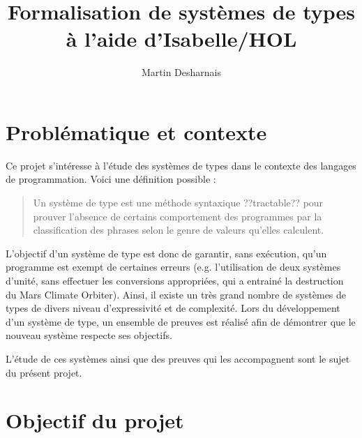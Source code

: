\documentclass[a4paper, oneside, 12pt, titlepage, draft]{article}
\begin{document}
\title{Formalisation de systèmes de types à l'aide d'Isabelle/HOL}
\author{Martin Desharnais}
\maketitle

\tableofcontents

\cleardoublepage

\section{Problématique et contexte}


Ce projet s'intéresse à l'étude des systèmes de types dans le contexte des langages de
programmation. Voici une définition possible :

\begin{quotation} %
  Un système de type est une méthode syntaxique ??tractable?? pour prouver l'absence de certains
  comportement des programmes par la classification des phrases selon le genre de valeurs qu'elles
  calculent.
\end{quotation}

L'objectif d'un système de type est donc de garantir, sans exécution, qu'un programme est exempt de
certaines erreurs (e.g. l'utilisation de deux systèmes d'unité, sans effectuer les conversions
appropriées, qui a entrainé la destruction du Mars Climate Orbiter). Ainsi, il existe un très grand
nombre de systèmes de types de divers niveau d'expressivité et de complexité. Lors du développement
d'un système de type, un ensemble de preuves est réalisé afin de démontrer que le nouveau système
respecte ses objectifs.

L'étude de ces systèmes ainsi que des preuves qui les accompagnent sont le sujet du présent projet.

\section{Objectif du projet}

\end{document}
